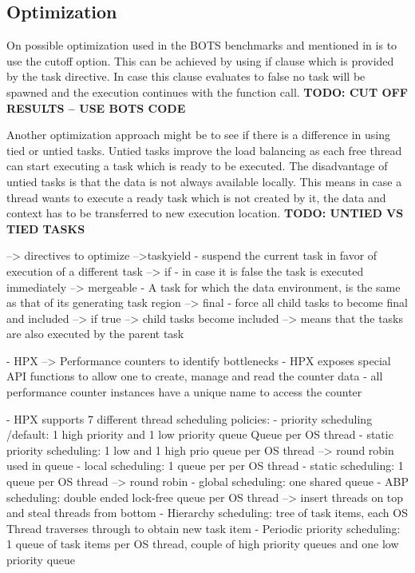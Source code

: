 \subsection{Optimization}
  On possible optimization used in the BOTS benchmarks and mentioned in \cite{LaGrone.2011} is to use the cutoff option.
  This can be achieved by using if clause which is provided by the task directive.
  In case this clause evaluates to false no task will be spawned and the execution continues with the function call.
  \textbf{TODO: CUT OFF RESULTS -- USE BOTS CODE}
   
  Another optimization approach might be to see if there is a difference in using tied or untied tasks.
  Untied tasks improve the load balancing as each free thread can start executing a task which is ready to be executed.
  The disadvantage of untied tasks is that the data is not always available locally.
  This means in case a thread wants to execute a ready task which is not created by it, the data and context has to be transferred to new execution location.
  \textbf{TODO: UNTIED VS TIED TASKS}	
	
		
    
    
    \cite{MKlemm.2018}
 --> directives to optimize
 	-->taskyield - suspend the current task in favor of execution of a different task
 	--> if - in case it is false the task is executed immediately
 	--> mergeable - A task for which the data environment, is the same as that of its generating task region
 	--> final - force all child tasks to become final and included
 		--> if true --> child tasks become included --> means that the tasks are also executed by the parent task

  \cite{TheSTEARGroup.2020}
    - HPX --> Performance counters to identify bottlenecks
    - HPX exposes special API functions to allow one to create, manage and read the counter data
    - all performance counter instances have a unique name to access the counter


  \cite{hpxMP.2019}
  \cite{TheSTEARGroup.2020}
    - HPX supports 7 different thread scheduling policies:
      - priority scheduling /default: 1 high priority and 1 low priority queue Queue per OS thread
      - static priority scheduling: 1 low and 1 high prio queue per OS thread --> round robin used in queue
      - local scheduling: 1 queue per per OS thread
      - static scheduling: 1 queue per OS thread --> round robin
      - global scheduling: one shared queue
      - ABP scheduling: double ended lock-free queue per OS thread --> insert threads on top and steal threads from bottom
      - Hierarchy scheduling: tree of task items, each OS Thread traverses through to obtain new task item
      - Periodic priority scheduling: 1 queue of task items per OS thread, couple of high priority queues and one low priority queue
      